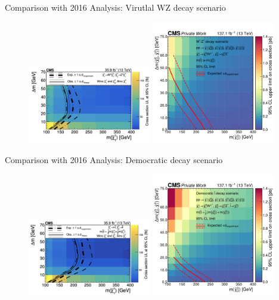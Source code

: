 \begin{frame}[fragile]{Comparison with 2016 Analysis: Virutlal WZ decay scenario}
  \begin{figure}[htpb]
    \centering
    \includegraphics[width=0.48\textwidth]{fig/2016/2016-wz.png}
    \includegraphics[width=0.48\textwidth]{fig/limit3d/Limit3D_wz.pdf}
  \end{figure}
\end{frame}


\begin{frame}[fragile]{Comparison with 2016 Analysis: Democratic \PSl decay scenario}
  \begin{figure}[htpb]
    \centering
    \includegraphics[width=0.48\textwidth]{fig/2016/2016-democratic.png}
    \includegraphics[width=0.48\textwidth]{fig/limit3d/Limit3D_democratic.pdf}
  \end{figure}
\end{frame}



